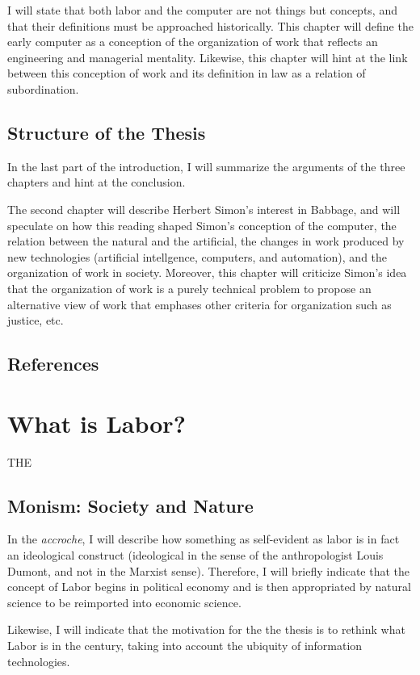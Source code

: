 \documentclass[version=last,draft=false,paper=A4,portrait,twoside=true,twocolumn=true,headinclude=false,footinclude=false,fontsize=12,BCOR=20mm,DIV=13,pagesize=auto,titlepage=firstiscover,mpinclude=false,open=right,chapterprefix=true,numbers=autoendperiod,headsepline=false,parskip=false]{scrbook}
\begin{document}
I will state that both labor and the computer are not things but concepts,
and that their definitions must be approached historically. This chapter
will define the early computer as a conception of the organization of work
that reflects an engineering and managerial mentality. Likewise, this
chapter will hint at the link between this conception of work and its
definition in law as a relation of subordination.
\section{Structure of the Thesis}
\label{sec:orgd0db00b}
In the last part of the introduction, I will summarize the arguments of the
three chapters and hint at the conclusion. 

The second chapter will describe Herbert Simon's interest in Babbage, and
will speculate on how this reading shaped Simon's conception of the
computer, the relation between the natural and the artificial, the changes
in work produced by new technologies (artificial intellgence, computers,
and automation), and the organization of work in society. Moreover, this
chapter will criticize Simon's idea that the organization of work is a
purely technical problem to propose an alternative view of work that
emphases other criteria for organization such as justice, etc.

\section*{References}
\printbibliography[heading=none,keyword=introduction]
\chapter{What is Labor?}
\label{sec:org0839166}
THE
\section{Monism: Society and Nature}
\label{sec:orgb065488}
In the \emph{accroche}, I will describe how something as self-evident as labor is
in fact an ideological construct (ideological in the sense of the
anthropologist Louis Dumont, and not in the Marxist sense). Therefore, I
will briefly indicate that the concept of Labor begins in political economy
and is then appropriated by natural science to be reimported into economic
science.

Likewise, I will indicate that the motivation for the the thesis is to
rethink what Labor is in the  century, taking into account the ubiquity
of information technologies. 
\end{document}
